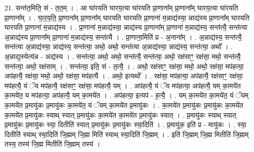 \documentclass[17pt]{extarticle}
\begin{document}
21. सन्त॑त॒मिति॒ सं - त॒त॒म् । . आ घा॑रयति घारय॒त्या घा॑रयति प्रा॒णाना᳚म् प्रा॒णाना᳚म् घारय॒त्या घा॑रयति प्रा॒णाना᳚म् । . घा॒र॒य॒ति॒ प्रा॒णाना᳚म् प्रा॒णाना᳚म् घारयति घारयति प्रा॒णाना॑ म॒न्नाद्य॑स्या॒ न्नाद्य॑स्य प्रा॒णाना᳚म् घारयति घारयति प्रा॒णाना॑ म॒न्नाद्य॑स्य । . प्रा॒णाना॑ म॒न्नाद्य॑स्या॒ न्नाद्य॑स्य प्रा॒णाना᳚म् प्रा॒णाना॑ म॒न्नाद्य॑स्य॒ सन्त॑त्यै॒ सन्त॑त्या अ॒न्नाद्य॑स्य प्रा॒णाना᳚म् प्रा॒णाना॑ म॒न्नाद्य॑स्य॒ सन्त॑त्यै । . प्रा॒णाना॒मिति॑ प्र - अ॒नाना᳚म् । . अ॒न्नाद्य॑स्य॒ सन्त॑त्यै॒ सन्त॑त्या अ॒न्नाद्य॑स्या॒ न्नाद्य॑स्य॒ सन्त॑त्या॒ अथो॒ अथो॒ सन्त॑त्या अ॒न्नाद्य॑स्या॒ न्नाद्य॑स्य॒ सन्त॑त्या॒ अथो᳚ । . अ॒न्नाद्य॒स्येत्य॑न्न - अद्य॑स्य । . सन्त॑त्या॒ अथो॒ अथो॒ सन्त॑त्यै॒ सन्त॑त्या॒ अथो॒ रक्ष॑साꣳ॒॒ रक्ष॑सा॒ मथो॒ सन्त॑त्यै॒ सन्त॑त्या॒ अथो॒ रक्ष॑साम् । . सन्त॑त्या॒ इति॒ सं - त॒त्यै॒ । . अथो॒ रक्ष॑साꣳ॒॒ रक्ष॑सा॒ मथो॒ अथो॒ रक्ष॑सा॒ मप॑हत्या॒ अप॑हत्यै॒ रक्ष॑सा॒ मथो॒ अथो॒ रक्ष॑सा॒ मप॑हत्यै । . अथो॒ इत्यथो᳚ । . रक्ष॑सा॒ मप॑हत्या॒ अप॑हत्यै॒ रक्ष॑साꣳ॒॒ रक्ष॑सा॒ मप॑हत्यै॒ यं ॅय मप॑हत्यै॒ रक्ष॑साꣳ॒॒ रक्ष॑सा॒ मप॑हत्यै॒ यम् । . अप॑हत्यै॒ यं ॅय मप॑हत्या॒ अप॑हत्यै॒ यम् का॒मये॑त का॒मये॑त॒ य मप॑हत्या॒ अप॑हत्यै॒ यम् का॒मये॑त । . अप॑हत्या॒ इत्यप॑ - ह॒त्यै॒ । . यम् का॒मये॑त का॒मये॑त॒ यं ॅयम् का॒मये॑त प्र॒मायु॑कः प्र॒मायु॑कः का॒मये॑त॒ यं ॅयम् का॒मये॑त प्र॒मायु॑कः । . का॒मये॑त प्र॒मायु॑कः प्र॒मायु॑कः का॒मये॑त का॒मये॑त प्र॒मायु॑कः स्याथ् स्यात् प्र॒मायु॑कः का॒मये॑त का॒मये॑त प्र॒मायु॑कः स्यात् । . प्र॒मायु॑कः स्याथ् स्यात् प्र॒मायु॑कः प्र॒मायु॑कः स्या॒ दितीति॑ स्यात् प्र॒मायु॑कः प्र॒मायु॑कः स्या॒दिति॑ । . प्र॒मायु॑क॒ इति॑ प्र - मायु॑कः । . स्या॒ दितीति॑ स्याथ् स्या॒दिति॑ जि॒ह्मम् जि॒ह्म मिति॑ स्याथ् स्या॒दिति॑ जि॒ह्मम् । . इति॑ जि॒ह्मम् जि॒ह्म मितीति॑ जि॒ह्मम् तस्य॒ तस्य॑ जि॒ह्म मितीति॑ जि॒ह्मम् तस्य॑ । \newline
\end{document}
